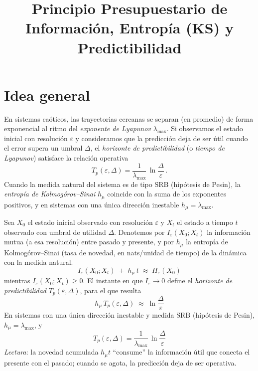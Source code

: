 \documentclass[11pt,a4paper]{article}
\title{Principio Presupuestario de Información, Entropía (KS) y Predictibilidad}
\author{ }
\date{ }
\begin{document}
\maketitle

\section*{Idea general}
En sistemas caóticos, las trayectorias cercanas se separan (en promedio) de forma exponencial al ritmo del
\emph{exponente de Lyapunov} $\lambda_{\max}$. Si observamos el estado inicial con resolución $\varepsilon$ y consideramos
que la predicción deja de ser útil cuando el error supera un umbral $\Delta$, el \emph{horizonte de predictibilidad}
(o \emph{tiempo de Lyapunov}) satisface la relación operativa
\[
T_p(\varepsilon,\Delta)=\frac{1}{\lambda_{\max}}\,
\ln\!\frac{\Delta}{\varepsilon}\,.
\]
Cuando la medida natural del sistema es de tipo SRB (hipótesis de Pesin), la \emph{entropía de Kolmogórov--Sinai}
$h_\mu$ coincide con la suma de los exponentes positivos, y en sistemas con una única dirección inestable
$h_\mu=\lambda_{\max}$.

\bigskip

\begin{tcolorbox}[title=Principio Presupuestario de Información]
Sea $X_0$ el estado inicial observado con resolución $\varepsilon$ y $X_t$ el estado a tiempo $t$
observado con umbral de utilidad $\Delta$. Denotemos por $I_\varepsilon(X_0;X_t)$ la información
mutua (a esa resolución) entre pasado y presente, y por $h_\mu$ la entropía de Kolmogórov--Sinai
(tasa de novedad, en nats/unidad de tiempo) de la dinámica con la medida natural.
\[
\boxed{\quad I_\varepsilon(X_0;X_t)\;+\;h_\mu\,t\;\approx\;H_\varepsilon(X_0)\quad}
\]
mientras $I_\varepsilon(X_0;X_t)\ge 0$. El instante en que $I_\varepsilon\!\to 0$ define el
\emph{horizonte de predictibilidad} $T_p(\varepsilon,\Delta)$, para el que resulta
\[
\boxed{\quad h_\mu\,T_p(\varepsilon,\Delta)\;\approx\;\ln\!\frac{\Delta}{\varepsilon}\quad}
\]
En sistemas con una única dirección inestable y medida SRB (hipótesis de Pesin), $h_\mu=\lambda_{\max}$, y
\[
\boxed{\quad T_p(\varepsilon,\Delta)=\dfrac{1}{\lambda_{\max}}\,
\ln\!\dfrac{\Delta}{\varepsilon}\quad}
\]
\emph{Lectura}: la novedad acumulada $h_\mu t$ ``consume'' la información útil que conecta el presente
con el pasado; cuando se agota, la predicción deja de ser operativa.
\end{tcolorbox}
\end{document}
